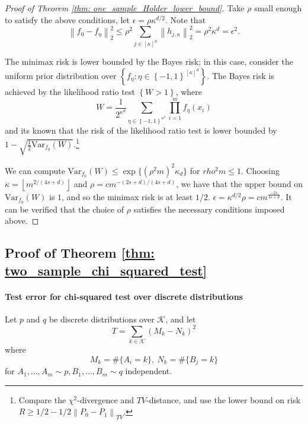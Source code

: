 \documentclass{article}
\newcommand{\norm}[1]{\left\lVert#1\right\rVert}
\newcommand{\set}[1]{\left\{#1\right\}}
\newcommand{\floor}[1]{\left\lfloor #1 \right\rfloor}
\newcommand{\Var}{\mathrm{Var}}
\newcommand{\1}{\mathbb{I}}
\theoremstyle{alden}
\theoremstyle{aldenthm}
\theoremstyle{definition}
\theoremstyle{remark}
\begin{document}
\begin{proof}[Proof of Theorem \ref{thm: one_sample_Holder_lower_bound}]
	Take $\rho$ small enough to satisfy the above conditions, let $\epsilon = \rho \kappa^{d/2}$. Note that
	\begin{equation*}
	\norm{f_0 - f_{\eta}}_2^2 \leq \rho^2 \sum_{j \in [\kappa]^d} \norm{h_{j,\kappa}}_2^2 = \rho^2 \kappa^d = \epsilon^2.
	\end{equation*}
	
	The minimax risk is lower bounded by the Bayes risk; in this case, consider  the uniform prior distribution over $\set{f_{\eta}: \eta \in \set{-1,1}^{[\kappa]^d}}$. The Bayes risk is achieved by the likelihood ratio test $\set{W > 1}$, where
	\begin{equation*}
	W = \frac{1}{2^{\kappa^d}} \sum_{\eta \in \set{-1,1}^{\kappa^d}} \prod_{i = 1}^{m} f_{\eta}(x_i)
	\end{equation*}
	and its known that the risk of the likelihood ratio test is lower bounded by $1 - \sqrt{\frac{1}{2} \Var_{f_0}(W)}$.\footnote{Compare the $\chi^2$-divergence and $TV$-distance, and use the lower bound on risk $R \geq 1/2 - 1/2\norm{P_0 - P_1}_{TV}$.}
	
	We can compute $\Var_{f_0}(W) \leq \exp \{(\rho^2 m)^2\kappa_d \}$ for $rho^2 m \leq 1$. Choosing $\kappa = \floor{m^{2/(4s + d)}}$ and $\rho = c m^{-(2s + d)/(4s + d)}$, we have that the upper bound on $\Var_{f_0}(W)$ is $1$, and so the minimax risk is at least $1/2$. $\epsilon = \kappa^{d/2} \rho = cm^{\frac{-2s}{4s + d}}$. It can be verified that the choice of $\rho$ satisfies the necessary conditions imposed above. 
\end{proof}

\subsection{Proof of Theorem \ref{thm: two_sample_chi_squared_test}}

\paragraph{Test error for chi-squared test over discrete distributions}

Let $p$ and $q$ be discrete distributions over $\mathcal{K}$, and let
\begin{equation*}
T = \sum_{k \in \mathcal{K}} (M_k - N_k)^2
\end{equation*}
where
\begin{equation*}
M_k = \#\{A_i = k\},~ N_k = \#\{B_j = k\}
\end{equation*}
for $A_1, \ldots, A_m \sim p, B_1, \ldots, B_m \sim q$ independent.
\end{document}
